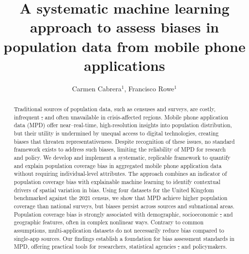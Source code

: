 \documentclass[]{rsos}%
\providecommand{\DIFdel}[1]{{\protect\color{red}\sout{#1}}}                      %
\providecommand{\DIFdelbegin}{} %
\providecommand{\DIFdelend}{} %
\begin{document}
\title{A systematic machine learning approach to assess biases in population data from mobile phone applications}

\author{
Carmen Cabrera$^{1}$,
Francisco Rowe$^{1}$}

\address{
  $^{1}$Geographic Data Science Lab, Department of Geography and Planning, University of Liverpool, Liverpool, United Kingdom.\\
  $^{}$}
\subject{
Mobile phone data,
Human mobility,
Explainable AI,
Spatial analysis}



\begin{abstract}
Traditional sources of population data, such as censuses and surveys, are costly, infrequent \DIFdelbegin \DIFdel{, }\DIFdelend and often unavailable in crisis-affected regions. Mobile phone application data (MPD) offer near--real-time, high-resolution insights into population distribution, but their utility is undermined by unequal access to digital technologies, creating biases that threaten representativeness. Despite recognition of these issues, no standard framework exists to address such biases, limiting the reliability of MPD for research and policy. We develop and implement a systematic, replicable framework to quantify and explain population coverage bias in aggregated mobile phone application data without requiring individual-level attributes. The approach combines an indicator of population coverage bias with explainable machine learning to identify contextual drivers of spatial variation in bias. Using four datasets for the United Kingdom benchmarked against the 2021 census, we show that MPD achieve higher population coverage than national surveys, but biases persist across sources and subnational areas. Population coverage bias is strongly associated with demographic, socioeconomic \DIFdelbegin \DIFdel{, }\DIFdelend and geographic features, often in complex nonlinear ways. Contrary to common assumptions, multi-application datasets do not necessarily reduce bias compared to single-app sources. Our findings establish a foundation for bias assessment standards in MPD, offering practical tools for researchers, statistical agencies \DIFdelbegin \DIFdel{, }\DIFdelend and policymakers.
\end{abstract}
\end{document}
